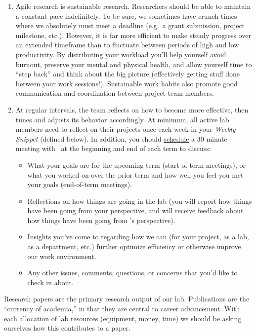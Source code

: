 \documentclass{tufte-book} %
\begin{document}
\begin{enumerate}
\item Agile research is sustainable research.  Researchers should be
  able to maintain a constant pace indefinitely.  To be sure, we
  sometimes have crunch times where we absolutely must meet a deadline
  (e.g.\ a grant submission, project milestone, etc.).  However, it is
  far more efficient to make steady progress over an extended
  timeframe than to fluctuate between periods of high and low
  productivity.  By distributing your workload you'll help yourself
  avoid burnout, preserve your mental and physical health, and allow
  yourself time to ``step back'' and think about the big picture
  (effectively getting stuff done between your work sessions!).
  Sustainable work habits also promote good communication and
  coordination between project team members.

\item At regular intervals, the team reflects on how to become more
  effective, then tunes and adjusts its behavior accordingly.  At
  minimum, all active lab members need to reflect on their projects
  once each week in your \textit{Weekly Snippet} (defined below).  In
  addition, you should
  \href{https://context-lab.youcanbook.me/}{schedule} a 30 minute
  meeting with \director~at the beginning and end of each term to
  discuss:
  \begin{itemize}
  \item What your goals are for the upcoming term (start-of-term
    meetings), or what you worked on over the prior term and how well
    you feel you met your goals (end-of-term meetings).
  \item Reflections on how things are going in the lab (you will
    report how things have been going from your perspective, and will
    receive feedback about how things have been going from \director's
    perspective).
  \item Insights you've come to regarding how we can (for your
    project, as a lab, as a department, etc.) further optimize
    efficiency or otherwise improve our work environment.
  \item Any other issues, comments, questions, or concerns that you'd
    like to check in about.
  \end{itemize}
\end{enumerate}


\noindent Research papers are the primary research output of our lab.
Publications are the ``currency of academia,'' in that they are
central to career advancement.  With each allocation of lab resources
(equipment, money, time) we should be asking ourselves how this
contributes to a paper.
\end{document}

